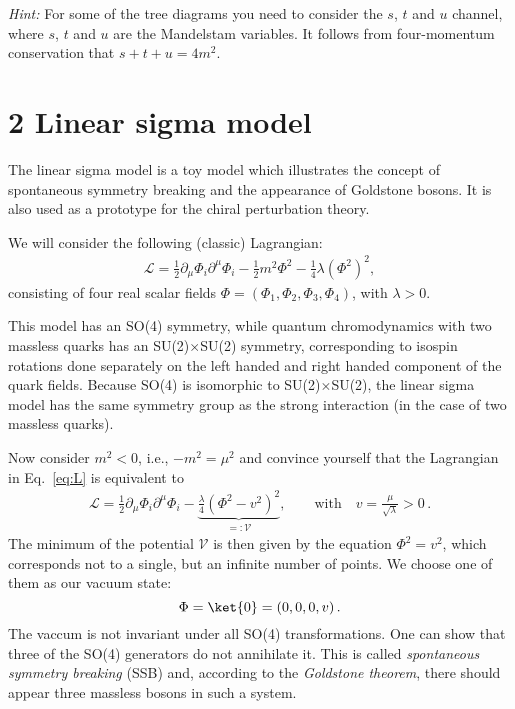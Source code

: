 \documentclass[prd,%
,superscriptaddress,%
nofootinbib,%
tightenlines ]{revtex4}
\newcommand{\comment}[1]{\textbf{[#1]}}
\begin{document}
\begin{itemize}
	\emph{Hint:} For some of the tree diagrams you need to consider the $s$, $t$ and $u$ channel, where $s$, $t$ and $u$ are the Mandelstam variables. It follows from four-momentum conservation that $s+t+u=4m^2$.
\end{itemize}



\section*{2 Linear sigma model}
\noindent
The linear sigma model is a toy model which illustrates the concept of spontaneous symmetry breaking
and the appearance of Goldstone bosons. It is also used as a prototype for the chiral perturbation theory.

We will consider the following (classic) Lagrangian:
\begin{eqnarray}
\mathcal{L} =
 \frac12 \partial_{\mu} \Phi_i \partial^{\mu} \Phi_i
 -\frac{1}{2} m^2 \Phi^2
 -\frac{1}{4}\lambda(\Phi^2)^2,
\label{eq:L}
\end{eqnarray}
consisting of four real scalar fields $\Phi=(\Phi_1,\Phi_2,\Phi_3,\Phi_4)$, with $\lambda>0$.
 
This model has an SO(4) symmetry, while quantum chromodynamics with two massless quarks has an SU(2)$\times$SU(2) symmetry, corresponding to isospin rotations done separately on the left handed and right handed component of the quark fields. Because SO(4) is isomorphic to SU(2)$\times$SU(2), the linear sigma model has the same symmetry group as the strong interaction (in the case of two massless quarks).


  Now consider $m^2<0$, i.e., $-m^2=\mu^2$ and convince yourself that the Lagrangian in Eq.~\eqref{eq:L} is equivalent to 
\begin{eqnarray}
\mathcal{L} = \frac12 \partial_{\mu} \Phi_i \partial^{\mu} \Phi_i
- \underbrace{\frac{\lambda}{4} {\left( \Phi^2 - v^2 \right)}^2}_{\displaystyle =: \mathcal V}, 
\qquad \text{with} \quad v=\frac{\mu}{\sqrt{\lambda}}>0 \,. 
\label{eq:Lwithv}
\end{eqnarray}
The minimum of the potential $\mathcal V$ is then given by the equation $\Phi^2 = v^2$,
which corresponds not to a single, but an infinite number of points.
We choose one of them as our vacuum state:
\begin{equation}
\Phi
=\ket{0} 
= (0,0,0,v)\,.
\label{eq:vacuum}
\end{equation}
The vaccum is not invariant under all SO(4) transformations. One can show that three of the SO(4) generators do not annihilate it. This is called \emph{spontaneous symmetry breaking} (SSB) and, according to the \emph{Goldstone theorem}, there should appear three massless bosons in such a system.
\end{document}
